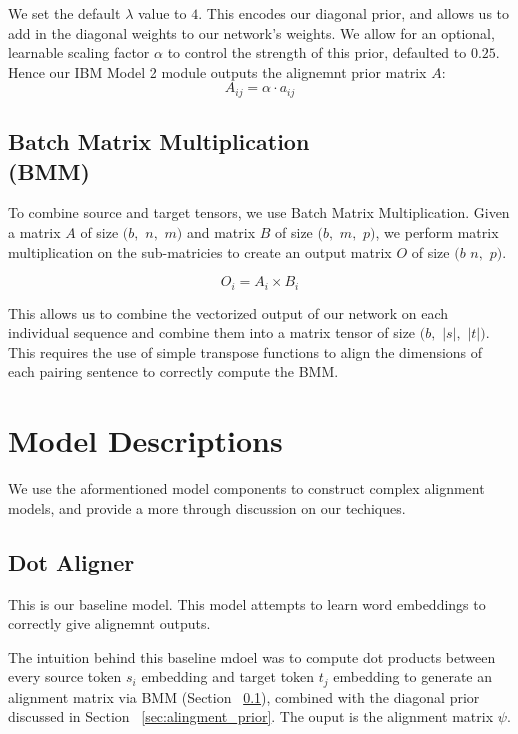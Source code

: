 \documentclass[twoside,twocolumn]{article}
\begin{document}
We set the default $\lambda$ value to $4$. This encodes our diagonal prior, and allows us to add in the diagonal weights to our network's weights. We allow for an optional, learnable scaling factor $\alpha$ to control the strength of this prior, defaulted to $0.25$. Hence our IBM Model 2 module outputs the alignemnt prior matrix $A$:
\begin{equation}
  A_{ij} = \alpha \cdot a_{ij}
\end{equation}

\subsection{Batch Matrix Multiplication\\(BMM)}
\label{sec:bmm}
To combine source and target tensors, we use Batch Matrix Multiplication. Given a matrix $A$ of size $(b,$ $n,$ $m)$ and matrix $B$ of size $(b,$ $m,$ $p)$, we perform matrix multiplication on the sub-matricies to create an output matrix $O$ of size $(b$ $n,$ $p)$.

\begin{equation}
  O_i = A_i \times B_i
\end{equation}

This allows us to combine the vectorized output of our network on each individual sequence and combine them into a matrix tensor of size $(b,$ $|s|,$ $|t|)$. This requires the use of simple transpose functions to align the dimensions of each pairing sentence to correctly compute the BMM.

\section{Model Descriptions}
We use the aformentioned model components to construct complex alignment models, and provide a more through discussion on our techiques.
\subsection{Dot Aligner}
This is our baseline model. This model attempts to learn word embeddings to correctly give alignemnt outputs.

The intuition behind this baseline mdoel was to compute dot products between every source token $s_i$ embedding and target token $t_j$ embedding to generate an alignment matrix via BMM (Section ~\ref{sec:bmm}), combined with the diagonal prior discussed in Section ~\ref{sec:alingment_prior}. The ouput is the alignment matrix $\psi$.
\end{document}

